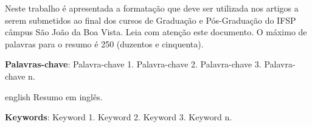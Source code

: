 \documentclass[
	article,			%
	11pt,				%
	oneside,			%
	a4paper,			%
	chapter=TITLE,		%
	section=TITLE,		%
	english,			%
	brazil,				%
	sumario=tradicional
]{abntex2}
\begin{document}
	
	
	\frenchspacing 
	
	
	\maketitle
	
	\begin{resumoumacoluna}
		
		Neste trabalho é apresentada a formatação que deve ser utilizada nos artigos a serem submetidos ao final dos cursos de Graduação e Pós-Graduação do IFSP câmpus São João da Boa Vista. Leia com atenção este documento. O máximo de palavras para o resumo é 250 (duzentos e cinquenta). 
		
		\vspace{\onelineskip}
		
		\noindent
		\textbf{Palavras-chave}: Palavra-chave 1. Palavra-chave 2. Palavra-chave 3. Palavra-chave n.
		
	\end{resumoumacoluna}
	
    \renewcommand{\resumoname}{Abstract}
    \begin{resumoumacoluna}
    	
        \begin{otherlanguage*}{english}
   	    	Resumo em inglês.
   		
       		\vspace{\onelineskip}
   		
   	    	\noindent
   		   \textbf{Keywords}: Keyword 1. Keyword 2. Keyword 3. Keyword n.
   		   
      \end{otherlanguage*} 
  
   	\end{resumoumacoluna}
        
	
\end{document}
